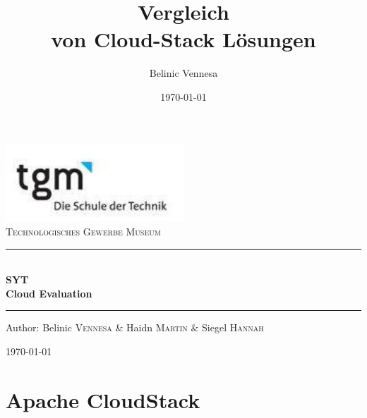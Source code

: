 \documentclass[a4paper,nochapterprefix,ngerman,12pt]{scrreprt}
\title{Vergleich\\von Cloud-Stack Lösungen}
\author{Belinic Vennesa}
\date{\today}
\begin{document}
\begin{titlepage}
\begin{center}
\includegraphics[width=0.5\textwidth]{logo}\\[1cm]    

\textsc{\LARGE Technologisches Gewerbe Museum}\\[1.5cm]

\rule{1.0\textwidth}{1mm}
{ \huge \bfseries  \\\large SYT\\ \huge Cloud Evaluation \\[0.4cm] }

\rule{1.0\textwidth}{1mm}

\noindent 
\vspace{7cm}

\begin{center}
\large
Author: 
Belinic \textsc{Vennesa} \&
Haidn \textsc{Martin} \&
Siegel \textsc{Hannah}
\end{center}

\vfill

{\large \today}

\end{center}
\end{titlepage}

\newpage
\tableofcontents

\newpage
{}

\chapter{Apache CloudStack} \thispagestyle{fancy}
\end{document}
